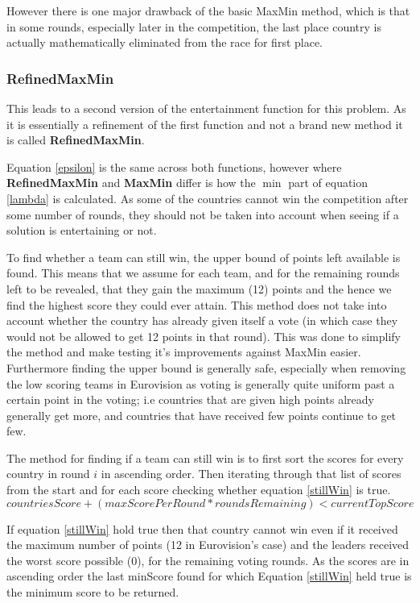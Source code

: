 \documentclass[12pt]{report}
\begin{document}
However there is one major drawback of the basic MaxMin method, which is that in some rounds, especially later in the competition, the last place country is actually mathematically eliminated from the race for first place.

\subsubsection{RefinedMaxMin}
This leads to a second version of the entertainment function for this problem. As it is essentially a refinement of the first function and not a brand new method it is called \textbf{RefinedMaxMin}.

Equation \ref{epsilon} is the same across both functions, however where \textbf{RefinedMaxMin} and \textbf{MaxMin} differ is how the $\min$ part of equation \ref{lambda} is calculated. As some of the countries cannot win the competition after some number of rounds, they should not be taken into account when seeing if a solution is entertaining or not.

To find whether a team can still win, the upper bound of points left available is found. This means that we assume for each team, and for the remaining rounds left to be revealed, that they gain the maximum (12) points and the hence we find the highest score they could ever attain. This method does not take into account whether the country has already given itself a vote (in which case they would not be allowed to get 12 points in that round). This was done to simplify the method and make testing it's improvements against MaxMin easier. Furthermore finding the upper bound is generally safe, especially when removing the low scoring teams in Eurovision as voting is generally quite uniform past a certain point in the voting; i.e countries that are given high points already generally get more, and countries that have received few points continue to get few.

The method for finding if a team can still win is to first sort the scores for every country in round $i$ in ascending order. Then iterating through that list of scores from the start and for each score checking whether equation \ref{stillWin} is true.
\begin{equation}\label{stillWin}
	countriesScore + (maxScorePerRound * roundsRemaining) < currentTopScore
\end{equation}

If equation \ref{stillWin} hold true then that country cannot win even if it received the maximum number of points (12 in Eurovision's case) and the leaders received the worst score possible (0), for the remaining voting rounds. As the scores are in ascending order the last minScore found for which Equation \ref{stillWin} held true is the minimum score to be returned.
\end{document}
